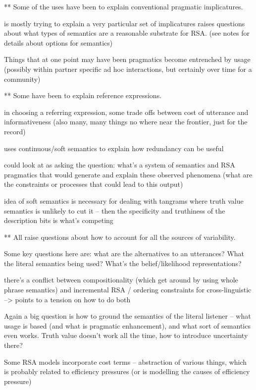 \documentclass[]{article}
\begin{document}
** Some of the uses have been to explain conventional pragmatic implicatures. 

\cite{bergen} is mostly trying to explain a very particular set of implicatures raises questions about what types of semantics are a reasonable substrate for RSA. (see notes for details about options for semantics) 

Things that at one point may have been pragmatics become entrenched by usage (possibly within partner specific ad hoc interactions, but certainly over time for a community) 

** Some have been to explain reference expressions. 

\cite{degen20200406} in choosing a referring expression, some trade offs between cost of utterance and informativeness (also many, many things no where near the frontier, just for the record) 

\cite{degen20200406} uses continuous/soft semantics to explain how redundancy can be useful

could look at \cite{degen20200406} as asking the question: what's a system of semantics and RSA pragmatics that would generate and explain these observed phenomena (what are the constraints or processes that could lead to this output) 

idea of soft semantics is necessary for dealing with tangrams where truth value semantics is unlikely to cut it -- then the specificity and truthiness of the description bits is what's competing 

** All raise questions about how to account for all the sources of variability. 

Some key questions here are: what are the alternatives to an utterances? What the literal semantics being used? What's the belief/likelihood representations? 


there's a conflict between compositionality (which \cite{degen20200406} get around by using whole phrase semantics) and incremental RSA / ordering constraints for cross-linguistic --> points to a tension on how to do both

Again a big question is how to ground the semantics of the literal listener -- what usage is based (and what is pragmatic enhancement), and what sort of semantics even works. Truth value doesn't work all the time, how to introduce uncertainty there? 

Some RSA models incorporate cost terms -- abstraction of various things, which is probably related to efficiency pressures (or is modelling the causes of efficiency pressure) 
\end{document}
